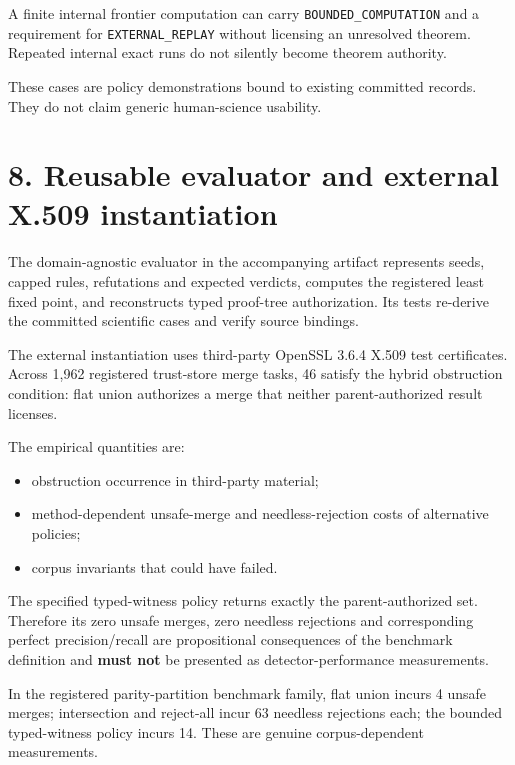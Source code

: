 \documentclass[11pt]{article}
\begin{document}
A finite internal frontier computation can carry
\texttt{BOUNDED\_COMPUTATION} and a requirement for
\texttt{EXTERNAL\_REPLAY} without licensing an unresolved theorem.
Repeated internal exact runs do not silently become theorem authority.

These cases are policy demonstrations bound to existing committed
records. They do not claim generic human-science usability.

\hypertarget{reusable-evaluator-and-external-x.509-instantiation}{%
\section{8. Reusable evaluator and external X.509
instantiation}\label{reusable-evaluator-and-external-x.509-instantiation}}

The domain-agnostic evaluator in the accompanying artifact represents
seeds, capped rules, refutations and expected verdicts, computes the
registered least fixed point, and reconstructs typed proof-tree
authorization. Its tests re-derive the committed scientific cases and
verify source bindings.

The external instantiation uses third-party OpenSSL 3.6.4 X.509 test
certificates. Across 1,962 registered trust-store merge tasks, 46
satisfy the hybrid obstruction condition: flat union authorizes a merge
that neither parent-authorized result licenses.

The empirical quantities are:

\begin{itemize}
\item
  obstruction occurrence in third-party material;
\item
  method-dependent unsafe-merge and needless-rejection costs of
  alternative policies;
\item
  corpus invariants that could have failed.
\end{itemize}

The specified typed-witness policy returns exactly the parent-authorized
set. Therefore its zero unsafe merges, zero needless rejections and
corresponding perfect precision/recall are propositional consequences of
the benchmark definition and \textbf{must not} be presented as
detector-performance measurements.

In the registered parity-partition benchmark family, flat union incurs 4
unsafe merges; intersection and reject-all incur 63 needless rejections
each; the bounded typed-witness policy incurs 14. These are genuine
corpus-dependent measurements.
\end{document}
